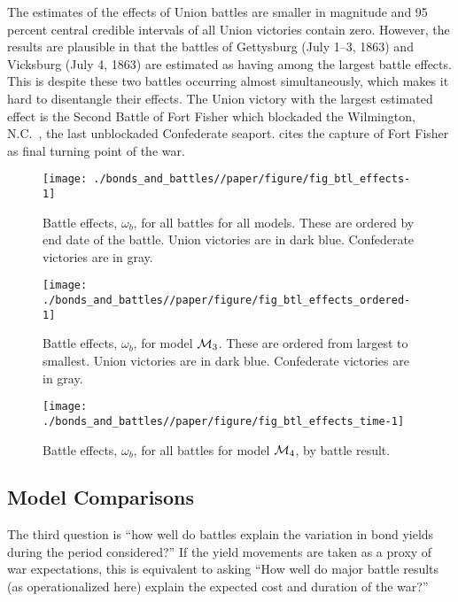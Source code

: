 The estimates of the effects of Union battles are smaller in magnitude and  95 percent central credible intervals of all Union victories contain zero.
However, the results are plausible in that the battles of Gettysburg (July 1--3, 1863) and Vicksburg (July 4, 1863) are estimated as having among the largest battle effects.
This is despite these two battles occurring almost simultaneously, which makes it hard to disentangle their effects.
The Union victory with the largest estimated effect is the Second Battle of Fort Fisher which blockaded the Wilmington, N.C.\ , the last unblockaded Confederate seaport. 
\textcite[154]{Reiter2009} cites the capture of Fort Fisher as final turning point of the war.

\begin{figure}[!htpb]
  \centering
  \texttt{[image: ./bonds\_and\_battles//paper/figure/fig\_btl\_effects-1]}
  \caption[Battle effects, $\omega_{b}$, for all battles for all models]{Battle effects, $\omega_{b}$, for all battles for all models.
    These are ordered by end date of the battle.
    Union victories are in dark blue.
    Confederate victories are in gray.
  }
  \label{bonds:fig:btl_effects}
\end{figure}

\begin{figure}[!htpb]
  \centering
  \texttt{[image: ./bonds\_and\_battles//paper/figure/fig\_btl\_effects\_ordered-1]}  
  \caption[Battle effects, $\omega_{b}$, for model $\Model{3}$.]{
    Battle effects, $\omega_{b}$, for model $\Model{3}$.
    These are ordered from largest to smallest.
    Union victories are in dark blue.
    Confederate victories are in gray.
  }
  \label{bonds:fig:btl_effects_ordered}
\end{figure}

\begin{figure}[!htpb]
  \centering
  \texttt{[image: ./bonds\_and\_battles//paper/figure/fig\_btl\_effects\_time-1]}  
  \caption{Battle effects, $\omega_{b}$, for all battles for model $\mathcal{M}_{\text{4}}$, by battle result.}
  \label{bonds:fig:btl_effects_time}
\end{figure}



\subsection{Model Comparisons}
\label{sec:over-effects-battl}

The third question is ``how well do battles explain the variation in bond yields during the period considered?''
If the yield movements are taken as a proxy of war expectations, this is equivalent to asking ``How well do major battle results (as operationalized here) explain the expected cost and duration of the war?''

